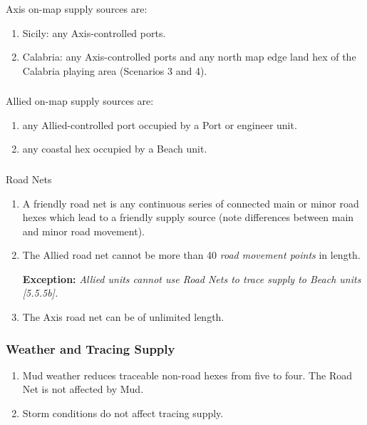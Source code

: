 \subsubsection{}
Axis on-map supply sources are:
\begin{enumerate}[label=\alph*.]
    \item Sicily: any Axis-controlled ports.
    \item Calabria: any Axis-controlled ports and any north map edge land hex of the Calabria playing area (Scenarios 3 and 4).
\end{enumerate}

\subsubsection{}
Allied on-map supply sources are:
\begin{enumerate}[label=\alph*.]
    \item any Allied-controlled port occupied by a Port or engineer unit.
    \item any coastal hex occupied by a Beach unit.
\end{enumerate}

\subsubsection{}
Road Nets
\begin{enumerate}[label=\alph*.]
    \item A friendly road net is any continuous series of connected main or minor road hexes which lead to a friendly supply source (note differences between main and minor road movement).
    \item The Allied road net cannot be more than 40 \textit{road movement points} in length.
    
    \textbf{Exception:} \textit{Allied units cannot use Road Nets to trace supply to Beach units [5.5.5b].}
    
    \item The Axis road net can be of unlimited length.
\end{enumerate}

\subsubsection{Weather and Tracing Supply}
\begin{enumerate}[label=\alph*.]
    \item Mud weather reduces traceable non-road hexes from five to four. The Road Net is not affected by Mud.
    \item Storm conditions do not affect tracing supply.
\end{enumerate}

